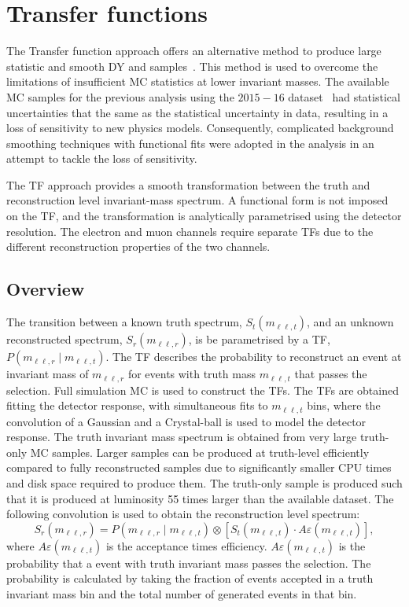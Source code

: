 \section{Transfer functions}\label{sec:datamc:transfer}
The Transfer function approach offers an alternative method to produce large statistic and smooth DY and \ttbar samples~\cite{Aad:2019fac,Falke:2693468}. This method is used to overcome the limitations of insufficient MC statistics at lower invariant masses. The available MC samples for the previous analysis using the $2015-16$ dataset~\cite{EXOT-2016-05} had statistical uncertainties that the same as the statistical uncertainty in data, resulting in a loss of sensitivity to new physics models. Consequently, complicated background smoothing techniques with functional fits were adopted in the analysis in an attempt to tackle the loss of sensitivity.

The TF approach provides a smooth transformation between the truth and reconstruction level invariant-mass spectrum. A functional form is not imposed on the TF, and the transformation is analytically parametrised using the detector resolution. The electron and muon channels require separate TFs due to the different reconstruction properties of the two channels.

\subsection{Overview}
The transition between a known truth spectrum, $S_t(m_{\ell\ell,t})$, and an unknown reconstructed spectrum, $S_r(m_{\ell\ell,r})$, is be parametrised by a TF, $P(m_{\ell\ell,r} \mid m_{\ell\ell,t})$. The TF describes the probability to reconstruct an event at invariant mass of $m_{\ell\ell,r}$ for events with truth mass $m_{\ell\ell,t}$ that passes the selection. Full simulation MC is used to construct the TFs. The TFs are obtained fitting the detector response, with simultaneous fits to $m_{\ell\ell,t}$ bins, where the convolution of a Gaussian and a Crystal-ball is used to model the detector response. The truth invariant mass spectrum is obtained from very large truth-only MC samples. Larger samples can be produced at truth-level efficiently compared to fully reconstructed samples due to significantly smaller CPU times and disk space required to produce them. The truth-only sample is produced such that it is produced at luminosity 55 times larger than the available dataset. The following convolution is used to obtain the reconstruction level spectrum: 
\begin{equation}\label{eq:TF_generalConv}
	S_r(m_{\ell\ell,r}) = P(m_{\ell\ell,r} \mid m_{\ell\ell,t}) \otimes \left[ S_t(m_{\ell\ell,t}) \cdot A\varepsilon(m_{\ell\ell,t}) \right], 
\end{equation}
where $A\varepsilon(m_{\ell\ell,t})$ is the acceptance times efficiency. $A\varepsilon(m_{\ell\ell,t})$ is the probability that a event with truth invariant mass passes the selection. The probability is calculated by taking the fraction of events accepted in a truth invariant mass bin and the total number of generated events in that bin. 

